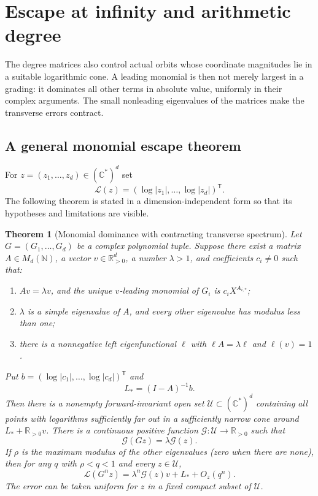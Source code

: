 \documentclass[11pt,a4paper]{article}
\numberwithin{equation}{section}
\newtheorem{theorem}{Theorem}[section]
\theoremstyle{definition}
\theoremstyle{remark}
\newcommand{\R}{\mathbb R}
\newcommand{\C}{\mathbb C}
\newcommand{\N}{\mathbb N}
\newcommand{\calU}{\mathcal U}
\newcommand{\calL}{\mathcal L}
\begin{document}
\section{Escape at infinity and arithmetic degree}\label{kmd:sec:escape}

The degree matrices also control actual orbits whose coordinate
magnitudes lie in a suitable logarithmic cone. A leading monomial
is then not merely largest in a grading: it dominates all other
terms in absolute value, uniformly in their complex arguments.
The small nonleading eigenvalues of the matrices make the
transverse errors contract.

\subsection{A general monomial escape theorem}
For $z=(z_1,\ldots,z_d)\in(\C^*)^d$ set
\[
 \calL(z)=(\log|z_1|,\ldots,\log|z_d|)^\mathsf T.
\]
The following theorem is stated in a dimension-independent form so
that its hypotheses and limitations are visible.

\begin{theorem}[Monomial dominance with contracting transverse spectrum]
\label{kmd:thm:escape}
Let $G=(G_1,\ldots,G_d)$ be a complex polynomial tuple. Suppose
there exist a matrix $A\in M_d(\N)$, a vector $v\in\R_{>0}^d$, a
number $\lambda>1$, and coefficients $c_i\ne0$ such that:
\begin{enumerate}[label=\textup{(\alph*)}]
\item $Av=\lambda v$, and the unique $v$-leading monomial of $G_i$
      is $c_iX^{A_{i,*}}$;
\item $\lambda$ is a simple eigenvalue of $A$, and every other
      eigenvalue has modulus less than one;
\item there is a nonnegative left eigenfunctional $\ell$ with
      $\ell A=\lambda\ell$ and $\ell(v)=1$.
\end{enumerate}
Put $b=(\log|c_1|,\ldots,\log|c_d|)^\mathsf T$ and
\begin{equation}
 L_*=(I-A)^{-1}b.
 \label{kmd:eq:Lstar}
\end{equation}
Then there is a nonempty forward-invariant open set
$\calU\subset(\C^*)^d$ containing all points with logarithms
sufficiently far out in a sufficiently narrow cone around
$L_*+\R_{>0}v$. There is a continuous positive function
$\mathcal G:\calU\to\R_{>0}$ such that
\begin{equation}
 \mathcal G(Gz)=\lambda\mathcal G(z).
 \label{kmd:eq:Gfunctional}
\end{equation}
If $\rho$ is the maximum modulus of the other eigenvalues (zero
when there are none), then for any $q$ with $\rho<q<1$ and every $z\in\calU$,
\begin{equation}
 \calL(G^n z)=\lambda^n\mathcal G(z)v+L_*+O_z(q^n).
 \label{kmd:eq:escape-asymptotic}
\end{equation}
The error can be taken uniform for $z$ in a fixed compact subset
of $\calU$.
\end{theorem}
\end{document}
